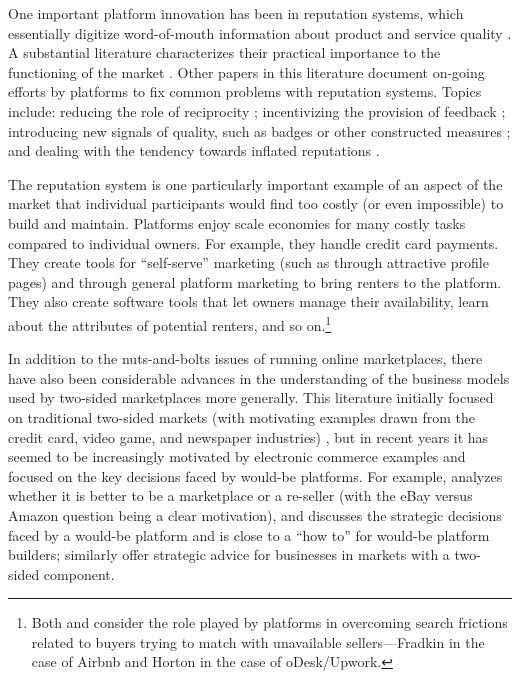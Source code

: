 \documentclass[11pt]{article}
\begin{document}
One important platform innovation has been in reputation systems, which essentially digitize word-of-mouth information about product and service quality \cite{dellarocas2003digitization}. 
A substantial literature characterizes their practical importance to the functioning of the market \cite{cabral2010dynamics, resnick2000reputation, resnick2002trust}.
Other papers in this literature document on-going efforts by platforms to fix common problems with reputation systems.
Topics include: reducing the role of reciprocity \citep{bolton2013engineering};
incentivizing the provision of feedback \citep{fradkin2015bias}; 
introducing new signals of quality, such as badges or other constructed measures \citep{hui2014lemon, nosko2015limits}; 
and dealing with the tendency towards inflated reputations \citep{horton2015reputation}.  

The reputation system is one particularly important example of an aspect of the market that individual participants would find too costly (or even impossible) to build and maintain. 
Platforms enjoy scale economies for many costly tasks compared to individual owners. 
For example, they handle credit card payments. 
They create tools for ``self-serve'' marketing (such as through attractive profile pages) and through general platform marketing to bring renters to the platform. 
They also create software tools that let owners manage their availability, learn about the attributes of potential renters, and so on.\footnote{
  Both \cite{horton2014misdirected} and \cite{fradkin2013search} consider the role played by platforms in overcoming search frictions related to buyers trying to match with unavailable sellers---Fradkin in the case of Airbnb and Horton in the case of oDesk/Upwork. 
}

In addition to the nuts-and-bolts issues of running online marketplaces, there have also been considerable advances in the understanding of the business models used by two-sided marketplaces more generally. 
This literature initially focused on traditional two-sided markets (with motivating examples drawn from the credit card, video game, and  newspaper industries) \citep{rochet2003platform, rochet2006two}, 
but in recent years it has seemed to be increasingly motivated by electronic commerce examples and focused on the key decisions faced by would-be platforms.
For example, \cite{hagiu2014marketplace} analyzes whether it is better
to be a marketplace or a re-seller (with the eBay versus Amazon
question being a clear motivation), and \cite{hagiu2014strategic}
discusses the strategic decisions faced by a would-be platform and is
close to a ``how to'' for would-be platform builders; similarly \cite{eisenmann2006strategies} offer strategic advice for businesses in markets with a two-sided component.  
\end{document}
